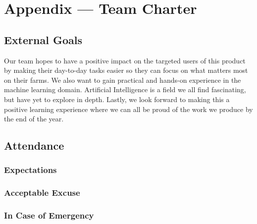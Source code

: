 \documentclass{article}
\begin{document}
\newpage{}

\section*{Appendix --- Team Charter}


\subsection*{External Goals}
Our team hopes to have a positive impact on the targeted users of this product by making their day-to-day tasks easier so they can focus on what matters most on their farms. We also want to gain practical and hands-on experience in the machine learning domain. Artificial Intelligence is a field we all find fascinating, but have yet to explore in depth. Lastly, we look forward to making this a positive learning experience where we can all be proud of the work we produce by the end of the year.

\subsection*{Attendance}

\subsubsection*{Expectations}


\subsubsection*{Acceptable Excuse}


\subsubsection*{In Case of Emergency}

\end{document}
